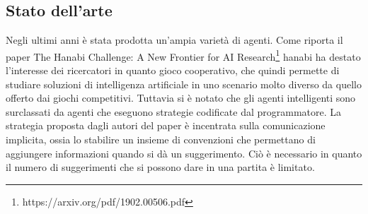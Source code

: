 \documentclass{article}
\begin{document}
\subsection{Stato dell'arte}
Negli ultimi anni è stata prodotta un'ampia varietà di agenti. Come riporta il paper The Hanabi Challenge: A New Frontier for AI Research\footnote{ https://arxiv.org/pdf/1902.00506.pdf} hanabi ha destato l'interesse dei ricercatori in quanto gioco cooperativo, che quindi permette di studiare soluzioni di intelligenza artificiale in uno scenario molto diverso da quello offerto dai giochi competitivi.
Tuttavia si è notato che gli agenti intelligenti sono surclassati da agenti che eseguono strategie codificate dal programmatore.\newline
\newline
La strategia proposta dagli autori del paper è incentrata sulla comunicazione implicita, ossia lo stabilire un insieme di convenzioni che permettano di aggiungere informazioni quando si dà un suggerimento. Ciò è necessario in quanto il numero di suggerimenti che si possono dare in una partita è limitato.
\end{document}

